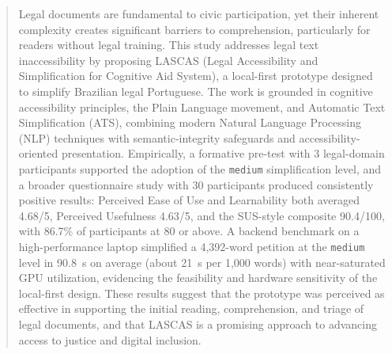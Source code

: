 \documentclass[english]{UNISINOSartigo} %
\begin{document}
\raggedbottom
\capa
\folhaderosto


\begin{abstract}
Legal documents are fundamental to civic participation, yet their inherent complexity creates significant barriers to comprehension, particularly for readers without legal training. This study addresses legal text inaccessibility by proposing LASCAS (Legal Accessibility and Simplification for Cognitive Aid System), a local-first prototype designed to simplify Brazilian legal Portuguese. The work is grounded in cognitive accessibility principles, the Plain Language movement, and Automatic Text Simplification (ATS), combining modern Natural Language Processing (NLP) techniques with semantic-integrity safeguards and accessibility-oriented presentation. Empirically, a formative pre-test with 3 legal-domain participants supported the adoption of the \texttt{medium} simplification level, and a broader questionnaire study with 30 participants produced consistently positive results: Perceived Ease of Use and Learnability both averaged 4.68/5, Perceived Usefulness 4.63/5, and the SUS-style composite 90.4/100, with 86.7\% of participants at 80 or above. A backend benchmark on a high-performance laptop simplified a 4,392-word petition at the \texttt{medium} level in 90.8~s on average (about 21~s per 1,000 words) with near-saturated GPU utilization, evidencing the feasibility and hardware sensitivity of the local-first design. These results suggest that the prototype was perceived as effective in supporting the initial reading, comprehension, and triage of legal documents, and that LASCAS is a promising approach to advancing access to justice and digital inclusion.
\end{abstract}
\end{document}
